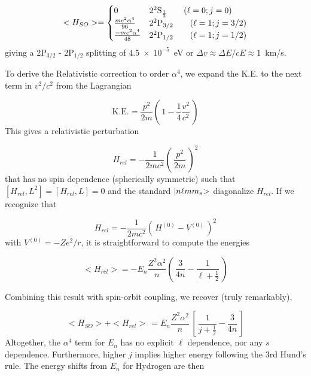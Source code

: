 \documentclass[graybox]{svmult}
\def\ohf{\frac{1}{2}}
\def\ket#1{{|#1\negmedspace>}}
\def\ltk{\left [ \,}
\def\ltp{\left ( \,}
\def\rtk{\, \right  ] }
\def\rtp{\, \right  ) }
\def\sci#1{{\; \times \; 10^{#1}}}
\begin{document}
\begin{equation}
<H_{SO}> = 
  \begin{cases}
	0 &  2 ^2{\rm S}_\ohf \quad\quad (\ell = 0; j=0) \\
     \frac{mc^2 \alpha^4}{96} &  2 ^2{\rm P}_{3/2} \quad\quad (\ell=1; j=3/2) \\
     \frac{-mc^2 \alpha^4}{48} &  2 ^2{\rm P}_{1/2} \quad\quad (\ell=1; j=1/2) \\
  \end{cases}
\end{equation}
giving a 2P$_{3/2}$ - 2P$_{1/2}$ splitting of $4.5 \sci{-5}$~eV
or $\Delta v \approx \Delta E / cE \approx 1$~km/s.

To derive the Relativistic correction to order $\alpha^4$,
we expand the K.E. to the next term in $v^2/c^2$ from the Lagrangian

\begin{equation}
\text{K.E.} = \frac{p^2}{2m} \ltp 1 - \frac{1}{4} \frac{v^2}{c^2} \rtp
\end{equation}
This gives a relativistic perturbation 

\begin{equation}
H_{rel} = -\frac{1}{2mc^2} \ltp \frac{p^2}{2m} \rtp^2
\end{equation}
that has no spin dependence (spherically symmetric)
such that $[H_{rel}, L^2] = [H_{rel}, L] = 0$
and the standard $\ket{n \ell m m_s}$ diagonalize $H_{rel}$.
If we recognize that

\begin{equation*}
H_{rel} = -\frac{1}{2mc^2} \ltp H^{(0)} - V^{(0)} \rtp^2
\end{equation*}
with $V^{(0)} = -Z e^2/r$, it is straightforward to
compute the energies

\begin{equation}
<H_{rel}> = -E_n \frac{Z^2 \alpha^2}{n} \ltp \frac{3}{4n} - \frac{1}{\ell + \ohf} \rtp
\end{equation}

Combining this result with spin-orbit coupling,
we recover (truly remarkably), 

\begin{equation}
<H_{SO}> + <H_{rel}> \, = E_n \frac{Z^2 \alpha^2}{n} \, 
\ltk \frac{1}{j+\ohf} - \frac{3}{4n} \rtk
\end{equation}
Altogether, the $\alpha^4$ term for $E_n$ has
no explicit $\ell$ dependence, nor any $s$ dependence.
Furthermore, higher $j$ implies higher energy 
following the 3rd Hund's rule.
The energy shifts from $E_n$ for Hydrogen are then
\end{document}
